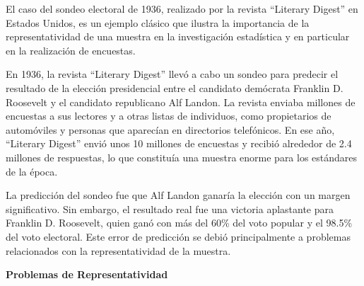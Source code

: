 \documentclass[
  letterpaper,
  DIV=11,
  numbers=noendperiod]{scrreprt}
\begin{document}
\begin{tcolorbox}[enhanced jigsaw, arc=.35mm, breakable, coltitle=black, left=2mm, opacityback=0, bottomtitle=1mm, colbacktitle=quarto-callout-tip-color!10!white, title=\textcolor{quarto-callout-tip-color}{\faLightbulb}\hspace{0.5em}{Ejemplo. Sondeo Electoral de 1936}, titlerule=0mm, colback=white, colframe=quarto-callout-tip-color-frame, bottomrule=.15mm, rightrule=.15mm, opacitybacktitle=0.6, toptitle=1mm, toprule=.15mm, leftrule=.75mm]

El caso del sondeo electoral de 1936, realizado por la revista
``Literary Digest'' en Estados Unidos, es un ejemplo clásico que ilustra
la importancia de la representatividad de una muestra en la
investigación estadística y en particular en la realización de
encuestas.

En 1936, la revista ``Literary Digest'' llevó a cabo un sondeo para
predecir el resultado de la elección presidencial entre el candidato
demócrata Franklin D. Roosevelt y el candidato republicano Alf Landon.
La revista enviaba millones de encuestas a sus lectores y a otras listas
de individuos, como propietarios de automóviles y personas que aparecían
en directorios telefónicos. En ese año, ``Literary Digest'' envió unos
10 millones de encuestas y recibió alrededor de 2.4 millones de
respuestas, lo que constituía una muestra enorme para los estándares de
la época.

La predicción del sondeo fue que Alf Landon ganaría la elección con un
margen significativo. Sin embargo, el resultado real fue una victoria
aplastante para Franklin D. Roosevelt, quien ganó con más del 60\% del
voto popular y el 98.5\% del voto electoral. Este error de predicción se
debió principalmente a problemas relacionados con la representatividad
de la muestra.

\textbf{Problemas de Representatividad}


\end{tcolorbox}
\end{document}
